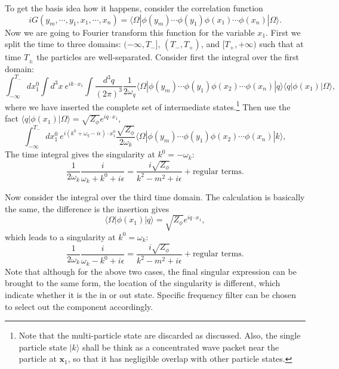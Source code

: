 To get the basis idea how it happens, consider the correlation function
\begin{equation}
	iG(y_m,\cdots,y_1,x_1,\cdots,x_n) = \langle\Omega|\phi(y_m)\cdots\phi(y_1) \phi(x_1)\cdots\phi(x_n)|\Omega\rangle.
\end{equation}
Now we are going to Fourier transform this function for the variable $x_1$.
First we split the time to three domains: $(-\infty,T_-]$, $(T_-,T_+)$, and $[T_+,+\infty)$ such that at time $T_{\pm}$ the particles are well-separated.
Consider first the integral over the first domain:
\begin{equation}
	\int_{-\infty}^{T_-} dx_1^0 \int d^3 x\ e^{i k\cdot x_1} \int \frac{d^3q}{(2\pi)^3}\frac{1}{2\omega_q}\langle \Omega|\phi(y_m)\cdots\phi(y_1) \phi(x_2)\cdots\phi(x_n)|q\rangle \langle q|\phi(x_1) |\Omega\rangle,
\end{equation}
where we have inserted the complete set of intermediate states.\footnote{Note that the multi-particle state are discarded as discussed. Also, the single particle state $|k\rangle$ shall be think as a concentrated wave packet near the particle at $\bm x_1$, so that it has negligible overlap with other particle states.}
Then use the fact $\langle q|\phi(x_1)|\Omega\rangle = \sqrt{Z_\phi} e^{i q \cdot x_1}$, 
\begin{equation}
	\int_{-\infty}^{T_-} dx_1^0 \ e^{i (k^0+\omega_q-i\epsilon)\cdot x_1^0}\frac{\sqrt{Z_\phi}}{2\omega_k}\langle \Omega|\phi(y_m)\cdots\phi(y_1) \phi(x_2)\cdots\phi(x_n)|k\rangle,
\end{equation}
The time integral gives the singularity at $k^0=-\omega_k$:
\begin{equation}
	\frac{1}{2\omega_k} \frac{i}{\omega_k+k^0 + i\epsilon} = \frac{i\sqrt{Z_\phi}}{k^2-m^2+i\epsilon} + \text{regular terms}.
\end{equation}

Now consider the integral over the third time domain.
The calculation is basically the same, the difference is the insertion gives
\begin{equation*}
	\langle\Omega| \phi(x_1) |q\rangle = \sqrt{Z_\phi} e^{i q \cdot x_1},
\end{equation*}
which leads to a singularity at $k^0=\omega_k$:
\begin{equation}
	\frac{1}{2\omega_k} \frac{i}{\omega_k-k^0 + i\epsilon} = \frac{i\sqrt{Z_\phi}}{k^2-m^2+i\epsilon} + \text{regular terms}.
\end{equation}
Note that although for the above two cases, the final singular expression can be brought to the same form, the location of the singularity is different, which indicate whether it is the in or out state.
Specific frequency filter can be chosen to select out the component accordingly.

